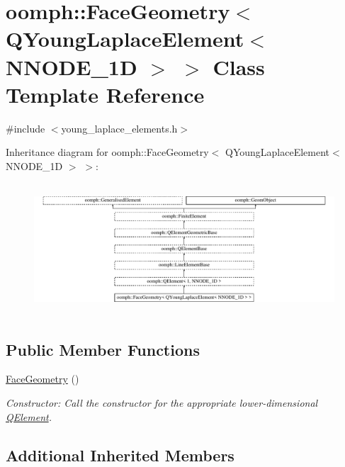 \hypertarget{classoomph_1_1FaceGeometry_3_01QYoungLaplaceElement_3_01NNODE__1D_01_4_01_4}{}\section{oomph\+:\+:Face\+Geometry$<$ Q\+Young\+Laplace\+Element$<$ N\+N\+O\+D\+E\+\_\+1D $>$ $>$ Class Template Reference}
\label{classoomph_1_1FaceGeometry_3_01QYoungLaplaceElement_3_01NNODE__1D_01_4_01_4}


{\ttfamily \#include $<$young\+\_\+laplace\+\_\+elements.\+h$>$}

Inheritance diagram for oomph\+:\+:Face\+Geometry$<$ Q\+Young\+Laplace\+Element$<$ N\+N\+O\+D\+E\+\_\+1D $>$ $>$\+:\begin{figure}[H]
\begin{center}
\leavevmode
\includegraphics[height=4.924623cm]{classoomph_1_1FaceGeometry_3_01QYoungLaplaceElement_3_01NNODE__1D_01_4_01_4}
\end{center}
\end{figure}
\subsection*{Public Member Functions}
\begin{DoxyCompactItemize}
\item 
\hyperlink{classoomph_1_1FaceGeometry_3_01QYoungLaplaceElement_3_01NNODE__1D_01_4_01_4_ae4250df7c43cfc267d465f30f60fbb82}{Face\+Geometry} ()
\begin{DoxyCompactList}\small\item\em Constructor\+: Call the constructor for the appropriate lower-\/dimensional \hyperlink{classoomph_1_1QElement}{Q\+Element}. \end{DoxyCompactList}\end{DoxyCompactItemize}
\subsection*{Additional Inherited Members}


